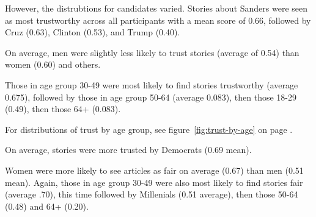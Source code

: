 However, the distrubtions for candidates varied. Stories about Sanders were seen as most trustworthy across all participants with a mean score of 0.66, followed by Cruz (0.63), Clinton (0.53), and Trump (0.40).
 

On average, men were slightly less likely to trust stories (average of 0.54) than women (0.60) and others. 

Those in age group 30-49 were most likely to find stories trustworthy (average 0.675), followed by those in age group 50-64 (average 0.083), then those 18-29 (0.49), then those 64+ (0.083).

For distributions of trust by age group, see figure~\ref{fig:trust-by-age} on page \pageref{fig:trust-by-age}.

On average, stories were more trusted by Democrats (0.69 mean).
 





Women were more likely to see articles as fair on average (0.67) than men (0.51 mean).
Again, those in age group 30-49 were also most likely to find stories fair (average .70), this time followed by Millenials (0.51 average), then those 50-64 (0.48) and 64+ (0.20).

